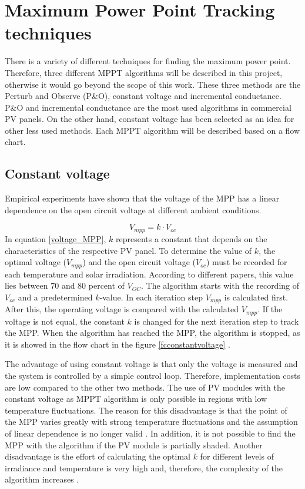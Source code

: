 \section{Maximum Power Point Tracking techniques\label{MPPTalgo}}

There is a variety of different techniques for finding the maximum power point. Therefore, three different MPPT algorithms will be described in this project, otherwise it would go beyond the scope of this work. These three methods are the Perturb and Observe (P\&O), constant voltage and incremental conductance. P\&O and incremental conductance are the most used algorithms in commercial PV panels. On the other hand, constant voltage has been selected as an idea for other less used methods. Each MPPT algorithm will be described based on a flow chart. 

\subsection{Constant voltage}
Empirical experiments have shown that the voltage of the MPP has a linear dependence on the open circuit voltage at different ambient conditions\cite{flowchartVC}.

\begin{equation} \label{voltage_MPP}
V_{mpp} = k \cdot V_{oc}	
\end{equation} 
In equation \ref{voltage_MPP}, $k$ represents a constant that depends on the characteristics of the respective PV panel. To determine the value of $k$, the optimal voltage ($V_{mpp}$) and the open circuit voltage ($V_{oc}$) must be recorded for each temperature and solar irradiation. According to different papers, this value lies between 70 and 80 percent of $V_{OC}$\cite{MPPTResearch}. The algorithm starts with the recording of $V_{oc}$ and a predetermined $k$-value. In each iteration step $V_{mpp}$ is calculated first. After this, the operating voltage is compared with the calculated $V_{mpp}$. If the voltage is not equal, the constant $k$ is changed for the next iteration step to track the MPP. When the algorithm has reached the MPP, the algorithm is stopped, as it is showed in the flow chart in the figure \ref{fcconstantvoltage} \cite{flowchartVC}. 

The advantage of using constant voltage is that only the voltage is measured and the system is controlled by a simple control loop. Therefore, implementation costs are low compared to the other two methods. The use of PV modules with the constant voltage as MPPT algorithm is only possible in regions with low temperature fluctuations. The reason for this disadvantage is that the point of the MPP varies greatly with strong temperature fluctuations and the assumption of linear dependence is no longer valid . In addition, it is not possible to find the MPP with the algorithm if the PV module is partially shaded. Another disadvantage is the effort of calculating the optimal $k$ for different levels of irradiance and temperature is very high and, therefore, the complexity of the algorithm increases \cite{flowchartVC}.

